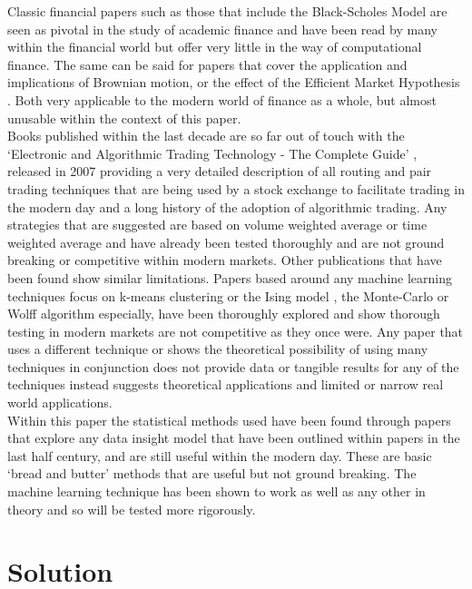 \documentclass[12pt,a4paper]{article}
\begin{document}
Classic financial papers such as those that include the Black-Scholes Model \cite{Saad2015} are seen as pivotal in the study of academic finance and have been read by many within the financial world but offer very little in the way of computational finance. The same can be said for papers that cover the application and implications of Brownian motion, or the effect of the Efficient Market Hypothesis \cite{Meng2016}. Both very applicable to the modern world of finance as a whole, but almost unusable within the context of this paper. \\

Books published within the last decade are so far out of touch with the `Electronic and Algorithmic Trading Technology - The Complete Guide' \cite{Kim2007}, released in 2007 providing a very detailed description of all routing and pair trading techniques that are being used by a stock exchange to facilitate trading in the modern day and a long history of the adoption of algorithmic trading. Any strategies that are suggested are based on volume weighted average or time weighted average and have already been tested thoroughly and are not ground breaking or competitive within modern markets. Other publications that have been found show similar limitations. Papers based around any machine learning techniques focus on k-means clustering \cite{Gerlein2016} or the Ising model \cite{Lima2017}, the Monte-Carlo or Wolff algorithm especially, have been thoroughly explored and show thorough testing in modern markets are not competitive as they once were. Any paper that uses a different technique or shows the theoretical possibility of using many techniques in conjunction does not provide data or tangible results for any of the techniques instead suggests theoretical applications and limited or narrow real world applications.\\

Within this paper the statistical methods used have been found through papers that explore any data insight model that have been outlined within papers in the last half century, and are still useful within the modern day. These are basic `bread and butter' methods that are useful but not ground breaking. The machine learning technique has been shown to work as well as any other in theory and so will be tested more rigorously.\\

\iffalse
#################################################################################
\fi

\section{Solution}
\end{document}

